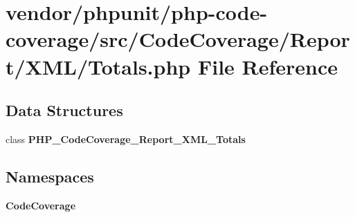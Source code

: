 \section{vendor/phpunit/php-\/code-\/coverage/src/\+Code\+Coverage/\+Report/\+X\+M\+L/\+Totals.php File Reference}
\label{_totals_8php}
\subsection*{Data Structures}
\begin{DoxyCompactItemize}
\item 
class {\bf P\+H\+P\+\_\+\+Code\+Coverage\+\_\+\+Report\+\_\+\+X\+M\+L\+\_\+\+Totals}
\end{DoxyCompactItemize}
\subsection*{Namespaces}
\begin{DoxyCompactItemize}
\item 
 {\bf Code\+Coverage}
\end{DoxyCompactItemize}
